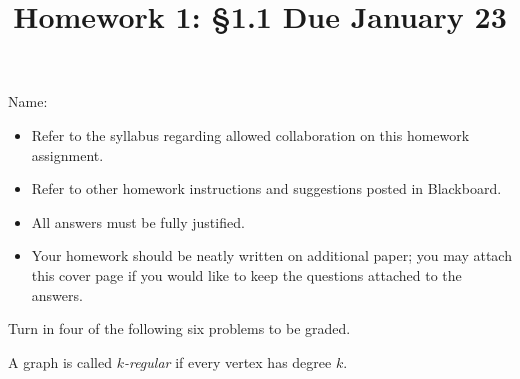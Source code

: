\documentclass[11pt]{amsart}
\begin{document}
\title{Homework 1: \S1.1 \qquad Due January 23}
\author{}
\date{}
\maketitle
\thispagestyle{empty}

\noindent Name:~\hrulefill~~\\

\begin{itemize}
\item Refer to the syllabus regarding allowed collaboration on this homework assignment.
\item Refer to other homework instructions and suggestions posted in Blackboard.
\item All answers must be fully justified.
\item Your homework should be neatly written on additional paper; you may attach this cover page if you would like to keep the questions attached to the answers.
\end{itemize}

\bigskip

Turn in four of the following six problems to be graded.

A graph is called \emph{$k$-regular} if every vertex has degree $k$.
\end{document}
